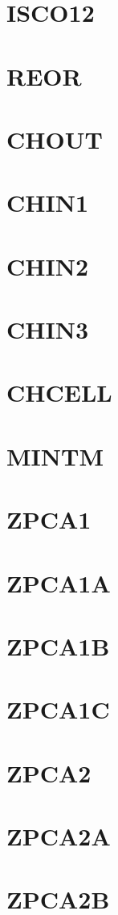 \documentclass[14pt,UTF8]{ctexbook}
\begin{document}
\section{ISCO12}
\section{REOR}
\section{CHOUT}
\section{CHIN1}
\section{CHIN2}
\section{CHIN3}
\section{CHCELL}
\section{MINTM}
\section{ZPCA1}
\section{ZPCA1A}
\section{ZPCA1B}
\section{ZPCA1C}
\section{ZPCA2}
\section{ZPCA2A}
\section{ZPCA2B}
\end{document}
